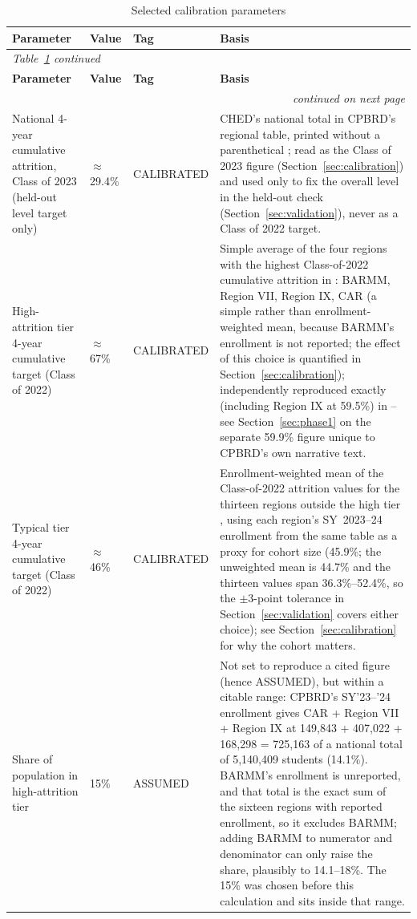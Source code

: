 \documentclass[11pt]{article}
\begin{document}
{\small
\begin{longtable}{@{}p{}p{}p{}p{}@{}}
\caption{Selected calibration parameters}
\label{tab:params}\\
\toprule
\textbf{Parameter} & \textbf{Value} & \textbf{Tag} & \textbf{Basis} \\
\midrule
\endfirsthead
\multicolumn{4}{l}{\textit{Table~\ref{tab:params} continued}}\\
\toprule
\textbf{Parameter} & \textbf{Value} & \textbf{Tag} & \textbf{Basis} \\
\midrule
\endhead
\midrule
\multicolumn{4}{r}{\textit{continued on next page}}\\
\endfoot
\bottomrule
\endlastfoot
National 4-year cumulative attrition, Class of 2023 (held-out level target only) & $\approx$ 29.4\% & CALIBRATED & CHED's national total in CPBRD's regional table, printed without a parenthetical \citep{cpbrd2026}; read as the Class of 2023 figure (Section~\ref{sec:calibration}) and used only to fix the overall level in the held-out check (Section~\ref{sec:validation}), never as a Class of 2022 target. \\
\addlinespace
High-attrition tier 4-year cumulative target (Class of 2022) & $\approx$ 67\% & CALIBRATED & Simple average of the four regions with the highest Class-of-2022 cumulative attrition in \citep{cpbrd2026}: BARMM, Region VII, Region IX, CAR (a simple rather than enrollment-weighted mean, because BARMM's enrollment is not reported; the effect of this choice is quantified in Section~\ref{sec:calibration}); independently reproduced exactly (including Region IX at 59.5\%) in \citep{edcom2025y2} -- see Section~\ref{sec:phase1} on the separate 59.9\% figure unique to CPBRD's own narrative text. \\
\addlinespace
Typical tier 4-year cumulative target (Class of 2022) & $\approx$ 46\% & CALIBRATED & Enrollment-weighted mean of the Class-of-2022 attrition values for the thirteen regions outside the high tier \citep{cpbrd2026}, using each region's SY~2023--24 enrollment from the same table as a proxy for cohort size (45.9\%; the unweighted mean is 44.7\% and the thirteen values span 36.3\%--52.4\%, so the $\pm$3-point tolerance in Section~\ref{sec:validation} covers either choice); see Section~\ref{sec:calibration} for why the cohort matters. \\
\addlinespace
Share of population in high-attrition tier & 15\% & ASSUMED & Not set to reproduce a cited figure (hence ASSUMED), but within a citable range: CPBRD's SY'23--'24 enrollment \citep{cpbrd2026} gives CAR + Region VII + Region IX at 149,843 + 407,022 + 168,298 = 725,163 of a national total of 5,140,409 students (14.1\%). BARMM's enrollment is unreported, and that total is the exact sum of the sixteen regions with reported enrollment, so it excludes BARMM; adding BARMM to numerator and denominator can only raise the share, plausibly to 14.1--18\%. The 15\% was chosen before this calculation and sits inside that range. \\

\end{longtable}}
\end{document}
